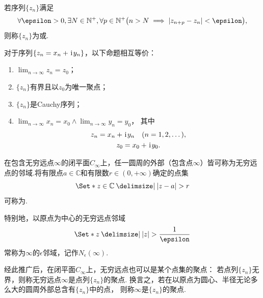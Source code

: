 \begin{definition}
若序列\(\{z_n\}\)满足\begin{equation*}
\forall \epsilon > 0, \exists N \in \mathbb{N}^+, \forall p\in\mathbb{N}^+ \bigl(
n > N  \implies  \abs{z_{n+p} - z_n} < \epsilon
\bigr),
\end{equation*}则称\(\{z_n\}\)为或.
\end{definition}

\begin{theorem}
对于序列\(\{z_n = x_n + \kern1pt\mathrm{i}\kern1pt y_n\}\)，以下命题相互等价：
\begin{enumerate}
	\item \(\lim_{n\to\infty} z_n = z_0\)；

	\item \(\{z_n\}\)有界且以\(z_0\)为唯一聚点；

	\item \(\{z_n\}\)是Cauchy序列；

	\item \(\lim_{n\to\infty} x_n = x_0 \land \lim_{n\to\infty} y_n = y_0\)，
	其中\begin{gather*}
		z_n = x_n + \kern1pt\mathrm{i}\kern1pt y_n \quad(n = 1,2,\dotsc), \\
		z_0 = x_0 + \kern1pt\mathrm{i}\kern1pt y_0.
	\end{gather*}
\end{enumerate}
\end{theorem}

\begin{definition}
在包含无穷远点\(\infty\)的闭平面\(C_\infty\)上，任一圆周的外部（包含点\(\infty\)）皆可称为无穷远点的邻域.将有限点\(a\in\mathbb{C}\)和有限数\(r\in(0,+\infty)\)确定的点集\begin{equation*}
\Set*{ z\in\mathbb{C} \given \abs{z-a}>r }
\end{equation*}可称为.

特别地，以原点为中心的无穷远点邻域\begin{equation*}
\Set*{ z \given \abs{z} > \frac{1}{\epsilon} }
\end{equation*}常称为\(\infty\)的\(\epsilon\)邻域，记作\(N_{\epsilon}(\infty)\).
\end{definition}
经此推广后，在闭平面\(C_\infty\)上，无穷远点也可以是某个点集的聚点：
若点列\(\{z_n\}\)无界，则称无穷远点\(\infty\)是点列\(\{z_n\}\)的聚点.
换言之，若在以原点为圆心、半径无论多么大的圆周外部总含有\(\{z_n\}\)中的点，
则称\(\infty\)是\(\{z_n\}\)的聚点.


